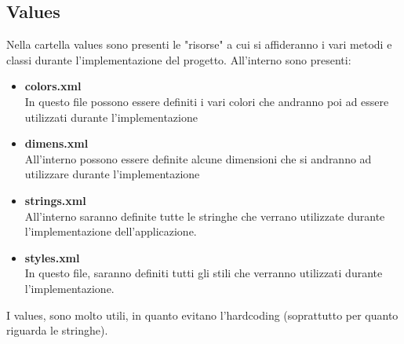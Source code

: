 \subsection{Values}
\label{values}
Nella cartella values sono presenti le "risorse" a cui si affideranno i vari metodi e classi durante l'implementazione del progetto.
All'interno sono presenti:
\begin{itemize}
\item \textbf{colors.xml}\\
    In questo file possono essere definiti i vari colori che andranno poi ad essere utilizzati durante l'implementazione
\item \textbf{dimens.xml}\\
    All'interno possono essere definite alcune dimensioni che si andranno ad utilizzare durante l'implementazione
\item \textbf{strings.xml}\\
    All'interno saranno definite tutte le stringhe che verrano utilizzate durante l'implementazione dell'applicazione.
\item \textbf{styles.xml}\\
    In questo file, saranno definiti tutti gli stili che verranno utilizzati durante l'implementazione.
\end{itemize}
I values, sono molto utili, in quanto evitano l'hardcoding (soprattutto per quanto riguarda le stringhe).

